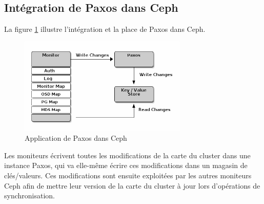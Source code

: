 \subsection{Intégration de Paxos dans Ceph}

La figure \ref{chap2:paxos_ceph} illustre l'intégration et la place de Paxos dans Ceph.

\begin{figure}[H]
    \centering
    \includegraphics[width=8cm]{./images/ceph_paxos.png}
    \caption{Application de Paxos dans Ceph}
    \label{chap2:paxos_ceph}
\end{figure}

Les moniteurs écrivent toutes les modifications de la carte du cluster dans une instance Paxos, qui va elle-même écrire ces modifications dans un magasin de clés/valeurs. Ces modifications sont ensuite exploitées par les autres moniteurs Ceph afin de mettre leur version de la carte du cluster à jour lors d'opérations de synchronisation.